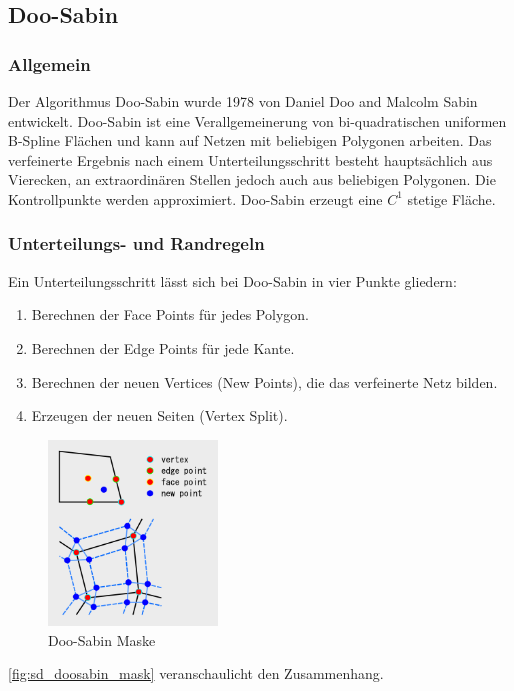 \subsection{Doo-Sabin} \label{subsec:doosabin}

\subsubsection*{Allgemein}

Der Algorithmus Doo-Sabin wurde 1978 von Daniel Doo and Malcolm Sabin entwickelt.
Doo-Sabin ist eine Verallgemeinerung von bi-quadratischen uniformen B-Spline Flächen
und kann auf Netzen mit beliebigen Polygonen arbeiten.
Das verfeinerte Ergebnis nach einem Unterteilungsschritt besteht hauptsächlich
aus Vierecken, an extraordinären Stellen jedoch auch aus beliebigen Polygonen.
Die Kontrollpunkte werden approximiert.
Doo-Sabin erzeugt eine \(C^1\) stetige Fläche.
\cite[S. 79f]{Zorin.subdivcourse}

\subsubsection*{Unterteilungs- und Randregeln}

Ein Unterteilungsschritt lässt sich bei Doo-Sabin in vier Punkte gliedern:
\begin{enumerate}
\item Berechnen der Face Points für jedes Polygon.
\item Berechnen der Edge Points für jede Kante.
\item Berechnen der neuen Vertices (New Points), die das verfeinerte Netz bilden.
\item Erzeugen der neuen Seiten (Vertex Split).
\end{enumerate}

\begin{figure}
\centering
\includegraphics[width=0.4\textwidth]{content/media/sd_doosabin_mask.png}
\caption{Doo-Sabin Maske \cite{Yoshihitoyagi.doosabin}}
\label{fig:sd_doosabin_mask}
\end{figure}
\autoref{fig:sd_doosabin_mask} veranschaulicht den Zusammenhang.


